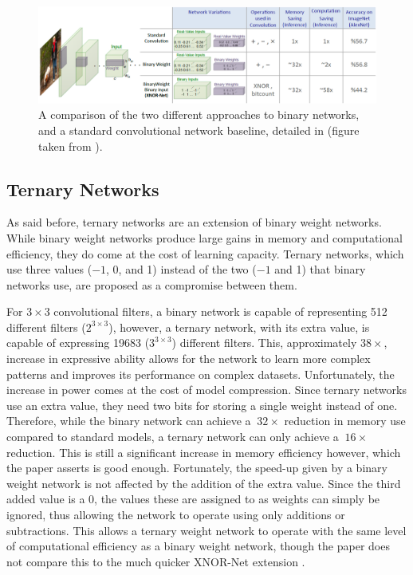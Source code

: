 \documentclass[11pt,a4paper,oldfontcommands]{memoir}
\begin{document}
\begin{figure}
    \centering
    \includegraphics[width=40em]{Images/Binary_Net_Chart.PNG}
    \caption{A comparison of the two different approaches to binary networks, and a standard convolutional network baseline, detailed in \cite{binary} (figure taken from \cite{binary}).}
    \label{fig:binary_net}
\end{figure}

\subsection{Ternary Networks}
\label{ss:ternary}
As said before, ternary networks are an extension of binary weight networks. While binary weight networks produce large gains in memory and computational efficiency, they do come at the cost of learning capacity. Ternary networks, which use three values ($-1$, 0, and 1) instead of the two ($-1$ and 1) that binary networks use, are proposed as a compromise between them.

For $3 \times 3$ convolutional filters, a binary network is capable of representing 512 different filters ($2^{3 \times 3}$), however, a ternary network, with its extra value, is capable of expressing 19683 ($3^{3 \times 3}$) different filters. This, approximately $38\times$, increase in expressive ability allows for the network to learn more complex patterns and improves its performance on complex datasets. Unfortunately, the increase in power comes at the cost of model compression. Since ternary networks use an extra value, they need two bits for storing a single weight instead of one. Therefore, while the binary network can achieve a $~32\times$ reduction in memory use compared to standard models, a ternary network can only achieve a $~16\times$ reduction. This is still a significant increase in memory efficiency however, which the paper \cite{ternary} asserts is good enough. Fortunately, the speed-up given by a binary weight network is not affected by the addition of the extra value. Since the third added value is a 0, the values these are assigned to as weights can simply be ignored, thus allowing the network to operate using only additions or subtractions. This allows a ternary weight network to operate with the same level of computational efficiency as a binary weight network, though the paper \cite{ternary} does not compare this to the much quicker XNOR-Net extension \cite{binary}.
\end{document}
